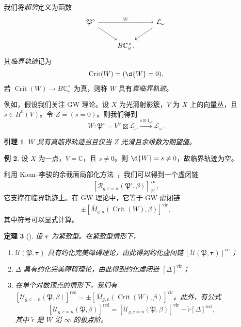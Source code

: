 \documentclass{amsart}
\newtheorem{thm}{定理}[section]
\newtheorem{lem}[thm]{引理}
\theoremstyle{definition}
\newtheorem{exm}[thm]{例}
\theoremstyle{remark}
\theoremstyle{plain}
\theoremstyle{definition}
\theoremstyle{remark}
\newcommand{\C}{\mathbb{C}}
\newcommand{\mc}[1]{\mathcal{#1}}
\newcommand{\mf}[1]{\mathfrak{#1}}
\newcommand{\mr}[1]{\mathrm{#1}}
\newcommand{\on}[1]{\operatorname{#1}}
\newcommand{\1}{\mathbf{1}}
\newcommand{\2}{\mathbf{2}}
\newcommand{\3}{\mathbf{3}}
\newcommand{\vir}{\mr{vir}}
\begin{document}
我们将\textit{超势}定义为函数
\begin{equation*}
\begin{tikzcd}
    \mf{P}^{\circ} \ar{rr}{W} \ar{dr} && \mc{L}_{\omega} \ar{dl} \\
    & B \C_{\omega}^{\times}.
\end{tikzcd}
\end{equation*}
其\textit{临界轨迹}记为
\[ \on{Crit}(W) = (\d{W} = 0). \]
若 \(\on{Crit}(W) \to B\C_{\omega}^{\times}\) 为真，则称 \(W\) 具有\textit{真临界轨迹}。

例如，假设我们关注 GW 理论。设 \(X\) 为光滑射影簇，\(V\) 为 \(X\) 上的向量丛，且 \(s \in H^0(V)\)。令 \(Z = (s = 0)\)。则我们得到
\[ W \colon \mf{P}^{\circ} = V^{\vee} \boxtimes \mc{L}_{\omega} \xrightarrow{s \otimes 1_{\omega}} \mc{L}_{\omega}. \]

\begin{lem}
    \(W\) 具有真临界轨迹当且仅当 \(Z\) 光滑且余维数为期望值。
\end{lem}

\begin{exm}
    设 \(X\) 为一点，\(V = \C\)，且 \(s \neq 0\)。则 \(\d{W} = s \neq 0\)，故临界轨迹为空。
\end{exm}

利用 Kiem–李骏的余截面局部化方法~\cite{KiemLi2013}，我们可以得到一个虚闭链
\[ [\mc{R}_{g, c=n}(\mf{P}^{\circ}, \beta)]_W^{\vir}, \]
它支撑在临界轨迹上。在 GW 理论中，它等于 GW 虚闭链
\[ \pm [\bar{M}_{g,n}(\on{Crit}(W), \beta)]^{\vir}, \]
其中符号可以显式计算。

\begin{thm}[{\cite{CJR2021,CJW2021}}]
    设 \(\bm{\tau}\) 为紧致型。在紧致型情形下，
    \begin{enumerate}
        \item \(\mc{U}(\mf{P}, \bm{\tau})\) 具有约化完美障碍理论，由此得到约化虚闭链 \([\mc{U}(\mf{P}, \bm{\tau})]^{\vir}\)；
        \item \(\Delta\) 具有约化完美障碍理论，由此得到约化虚闭链 \([\Delta]^{\vir}\)；
        \item 在单个对数顶点的情形下，我们有 \([\mc{U}_{g, c=n}(\mf{P}, \beta)]^{\on{red}} = \pm [\bar{M}_{g,n}(\on{Crit}(W), \beta)]^{\vir}\)。此外，有公式
            \[ [\mc{U}_{g, c=n}(\mf{P}, \beta)]^{\on{red}} = [\mc{U}_{g, c=n}(\mf{P}, \beta)]^{\vir} - \tilde{r} [\Delta]^{\on{red}}, \]
            其中 \(\tilde{r}\) 是 \(W\) 沿 \(\infty\) 的极点阶。
    \end{enumerate}
\end{thm}
\end{document}
